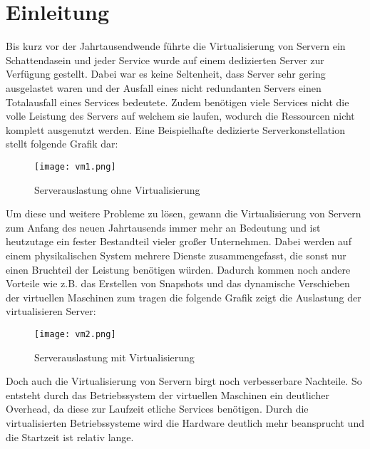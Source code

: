 \section{Einleitung}
\label{sec:Einleitung}

Bis kurz vor der Jahrtausendwende führte die Virtualisierung von Servern ein Schattendasein und jeder Service wurde auf einem dedizierten Server zur Verfügung gestellt. Dabei war es keine Seltenheit, dass Server sehr gering ausgelastet waren und der Ausfall eines nicht redundanten Servers einen Totalausfall eines Services bedeutete. Zudem benötigen viele Services nicht die volle Leistung des Servers auf welchem sie laufen, wodurch die Ressourcen nicht komplett ausgenutzt werden. Eine Beispielhafte dedizierte Serverkonstellation stellt folgende Grafik dar:
\begin{figure}[H]
	\begin{center}
		\texttt{[image: vm1.png]}
	\end{center}
	\caption[Serverauslastung ohne Virtualisierung]{Serverauslastung ohne Virtualisierung \footnotemark}
	\label{fig:HW1}
\end{figure}
Um diese und weitere Probleme zu lösen, gewann die Virtualisierung von Servern zum Anfang des neuen Jahrtausends immer mehr an Bedeutung und ist heutzutage ein fester Bestandteil vieler großer Unternehmen. Dabei werden auf einem physikalischen System mehrere Dienste zusammengefasst, die sonst nur einen Bruchteil der Leistung benötigen würden. Dadurch kommen noch andere Vorteile wie z.B. das Erstellen von Snapshots und das dynamische Verschieben der virtuellen Maschinen zum tragen die folgende Grafik zeigt die Auslastung der virtualisieren Server:
\begin{figure}[H]
	\begin{center}
		\texttt{[image: vm2.png]}
	\end{center}
	\caption[Serverauslastung mit Virtualisierung]{Serverauslastung mit Virtualisierung \footnotemark}
	\label{fig:HW1}
\end{figure}
Doch auch die Virtualisierung von Servern birgt noch verbesserbare Nachteile. So entsteht durch das Betriebssystem der virtuellen Maschinen ein deutlicher Overhead, da diese zur Laufzeit etliche Services benötigen. Durch die virtualisierten Betriebssysteme wird die Hardware deutlich mehr beansprucht und die Startzeit ist relativ lange.
